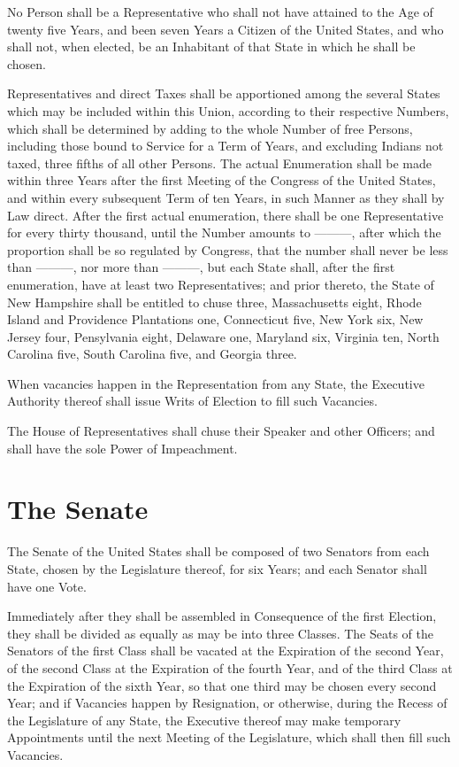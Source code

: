\documentclass{constitution}
\begin{document}
No Person shall be a Representative who shall not have attained to the Age of twenty five Years,
and been seven Years a Citizen of the United States,
and who shall not, when elected, be an Inhabitant of that State in which he shall be chosen.

Representatives and direct Taxes shall be apportioned
among the several States which may be included within this Union,
according to their respective Numbers,
which shall be determined by adding to the whole Number of free Persons,
including those bound to Service for a Term of Years,
and excluding Indians not taxed,
three fifths of all other Persons.
The actual Enumeration shall be made within three Years
after the first Meeting of the Congress of the United States,
and within every subsequent Term of ten Years,
in such Manner as they shall by Law direct.
After the first actual enumeration,
there shall be one Representative for every thirty thousand,
	until the Number amounts to ———,
after which the proportion shall be so regulated by Congress,
	that the number shall never be less than ———,
	nor more than ———,
but each State shall, after the first enumeration,
	have at least two Representatives;
and prior thereto,
the State of New Hampshire shall be entitled to chuse three,
	Massachusetts eight,
	Rhode Island and Providence Plantations one,
	Connecticut five,
	New York six,
	New Jersey four,
	Pensylvania eight,
	Delaware one,
	Maryland six,
	Virginia ten,
	North Carolina five,
	South Carolina five,
and	Georgia three.

When vacancies happen in the Representation from any State,
the Executive Authority thereof shall issue Writs of Election to fill such Vacancies.

The House of Representatives shall chuse their Speaker and other Officers;
and shall have the sole Power of Impeachment.

\section{The Senate}
The Senate of the United States shall be composed of two Senators from each State,
chosen by the Legislature thereof, for six Years;
and each Senator shall have one Vote.

Immediately after they shall be assembled in Consequence of the first Election,
they shall be divided as equally as may be into three Classes.
The Seats of the Senators of the first Class shall be vacated at the Expiration of the second Year,
of the second Class at the Expiration of the fourth Year,
and of the third Class at the Expiration of the sixth Year,
so that one third may be chosen every second Year;
and if Vacancies happen by Resignation, or otherwise,
during the Recess of the Legislature of any State,
the Executive thereof may make temporary Appointments
until the next Meeting of the Legislature,
which shall then fill such Vacancies.
\end{document}
